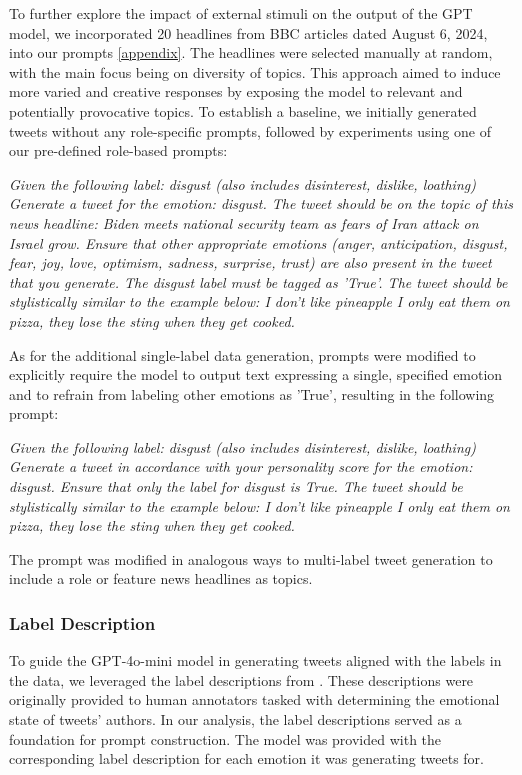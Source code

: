 \documentclass[manuscript]{clv3}
\begin{document}
To further explore the impact of external stimuli on the output of the GPT model, we incorporated 20 headlines from BBC articles dated August 6, 2024, into our prompts \autoref{appendix}. The headlines were selected manually at random, with the main focus being on diversity of topics. This approach aimed to induce more varied and creative responses by exposing the model to relevant and potentially provocative topics. To establish a baseline, we initially generated tweets without any role-specific prompts, followed by experiments using one of our pre-defined role-based prompts: 
\begin{example}
\textit{Given the following label: disgust (also includes disinterest, dislike, loathing) \newline
Generate a tweet for the emotion: disgust. The tweet should be on the topic of this news headline: Biden meets national security team as fears of Iran attack on Israel grow. Ensure that other appropriate emotions (anger, anticipation, disgust, fear, joy, love, optimism, sadness, surprise, trust) are also present in the tweet that you generate. The disgust label must be tagged as 'True'. The tweet should be stylistically similar to the example below: \newline
I don't like pineapple I only eat them on pizza, they lose the sting when they get cooked.}
\end{example}
As for the additional single-label data generation, prompts were modified to explicitly require the model to output text expressing a single, specified emotion and to refrain from labeling other emotions as 'True', resulting in the following prompt:
\begin{example}
\textit{Given the following label: disgust (also includes disinterest, dislike, loathing)\newline
Generate a tweet in accordance with your personality score for the emotion: disgust. Ensure that only the label for disgust is True. The tweet should be stylistically similar to the example below:\newline
I don't like pineapple I only eat them on pizza, they lose the sting when they get cooked.}
\end{example}
The prompt was modified in analogous ways to multi-label tweet generation to include a role or feature news headlines as topics.

\subsubsection{Label Description} To guide the GPT-4o-mini model in generating tweets aligned with the labels in the data, we leveraged the label descriptions from \citet{mohammad-kiritchenko-2018-understanding}. These descriptions were originally provided to human annotators tasked with determining the emotional state of tweets' authors. In our analysis, the label descriptions served as a foundation for prompt construction. The model was provided with the corresponding label description for each emotion it was generating tweets for.
\end{document}
